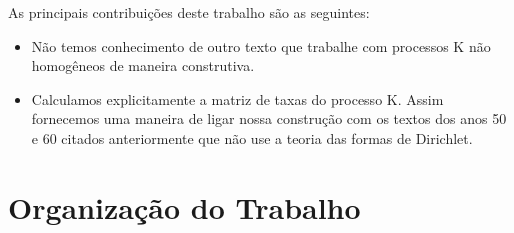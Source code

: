 As principais contribuições deste trabalho são as seguintes:

\begin{itemize}

\item Não temos conhecimento de outro texto que trabalhe com processos
  K não homogêneos de maneira construtiva.

\item Calculamos explicitamente a matriz de taxas do processo K. Assim
  fornecemos uma maneira de ligar nossa construção com os textos dos
  anos 50 e 60 citados anteriormente que não use a teoria das formas
  de Dirichlet.

\end{itemize}

\section{Organização do Trabalho}
\label{sec:organizacao_trabalho}




